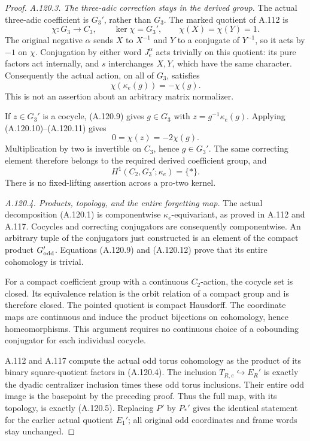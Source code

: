 \begin{proof}
\emph{A.120.3. The three-adic correction stays in the derived group.}
The actual three-adic coefficient is \(G_3'\), rather than \(G_3\).
The marked quotient of A.112 is
\[
       \chi:G_3\longrightarrow C_3,\qquad
       \ker\chi=G_3',\qquad \chi(X)=\chi(Y)=1.
 \tag{A.120.10}
\]
The original negative \(\alpha\) sends \(X\) to \(X^{-1}\)
and \(Y\) to a conjugate of \(Y^{-1}\), so it acts by \(-1\)
on \(\chi\). Conjugation by either word \(J_e^\alpha\)
acts trivially on this quotient: its pure factors act internally,
and \(s\) interchanges \(X,Y\), which have the same character.
Consequently the actual action, on all of \(G_3\), satisfies
\[
                         \chi(\kappa_e(g))=-\chi(g).
 \tag{A.120.11}
\]
This is not an assertion about an arbitrary matrix normalizer.

If \(z\in G_3'\) is a cocycle, (A.120.9) gives
\(g\in G_3\) with \(z=g^{-1}\kappa_e(g)\).
Applying (A.120.10)--(A.120.11) gives
\[
                         0=\chi(z)=-2\chi(g).
\]
Multiplication by two is invertible on \(C_3\), hence \(g\in G_3'\).
The same correcting element therefore belongs to the required
derived coefficient group, and
\[
                         H^1(C_2,G_3';\kappa_e)=\{*\}.
 \tag{A.120.12}
\]
There is no fixed-lifting assertion across a pro-two kernel.

\emph{A.120.4. Products, topology, and the entire forgetting map.}
The actual decomposition (A.120.1) is componentwise
\(\kappa_e\)-equivariant, as proved in A.112 and A.117.
Cocycles and correcting conjugators are consequently componentwise.
An arbitrary tuple of the conjugators just constructed is an element
of the compact product \(G_{\rm odd}'\).
Equations (A.120.9) and (A.120.12) prove that its entire cohomology
is trivial.

For a compact coefficient group with a continuous \(C_2\)-action,
the cocycle set is closed. Its equivalence relation is the orbit
relation of a compact group and is therefore closed.
The pointed quotient is compact Hausdorff.
The coordinate maps are continuous and induce the product
bijections on cohomology, hence homeomorphisms.
This argument requires no continuous choice of a cobounding
conjugator for each individual cocycle.

A.112 and A.117 compute the actual odd torus cohomology as the
product of its binary square-quotient factors in (A.120.4).
The inclusion \(T_{R,e}\hookrightarrow E_R'\) is exactly the
dyadic centralizer inclusion times these odd torus inclusions.
Their entire odd image is the basepoint by the preceding proof.
Thus the full map, with its topology, is exactly (A.120.5).
Replacing \(P'\) by \(P_*'\) gives the identical statement for
the earlier actual quotient \(E_1'\); all original odd coordinates
and frame words stay unchanged.


\end{proof}
